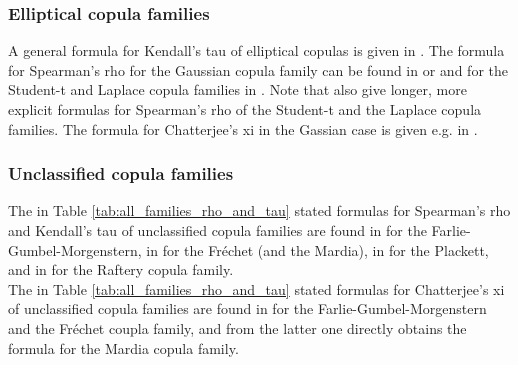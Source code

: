 \documentclass{article}
\begin{document}
\subsubsection{Elliptical copula families}
\label{subsubsec:ellipticals_spearman_rho_and_kendalls_tau}

A general formula for Kendall's tau of elliptical copulas is given in \cite[Theorem 5.4]{embrechts2001modelling}.
The formula for Spearman's rho for the Gaussian copula family can be found in \cite[Theorem 5.36]{Embrechts-2015} or \cite{heinen2020spearman} and for the Student-t and Laplace copula families in \cite[Proposition 1]{heinen2020spearman}.
Note that \cite[Proposition 4 and Remark 2]{heinen2020spearman} also give longer, more explicit formulas for Spearman's rho of the Student-t and the Laplace copula families.
The formula for Chatterjee's xi in the Gassian case is given e.g. in \cite[Example 4]{fuchs2021quantifying}.

\subsubsection{Unclassified copula families}
\label{subsubsec:unclassified_spearman_rho_and_kendalls_tau}

The in Table \ref{tab:all_families_rho_and_tau} stated formulas for Spearman's rho and Kendall's tau of unclassified copula families are found in \cite[Example 5.2 and 5.7 a)]{Nelsen-2006} for the Farlie-Gumbel-Morgenstern, in \cite[Example 5.3 and 5.6]{Nelsen-2006} for the Fréchet (and the Mardia), in \cite[Exercise 5.8]{Nelsen-2006} for the Plackett, and in \cite[Excercise 5.11]{Nelsen-2006} for the Raftery copula family. \\
The in Table \ref{tab:all_families_rho_and_tau} stated formulas for Chatterjee's xi of unclassified copula families are found in \cite[Example 4]{fuchs2021quantifying} for the Farlie-Gumbel-Morgenstern and the Fréchet coupla family, and from the latter one directly obtains the formula for the Mardia copula family.

\normalsize
\end{document}
